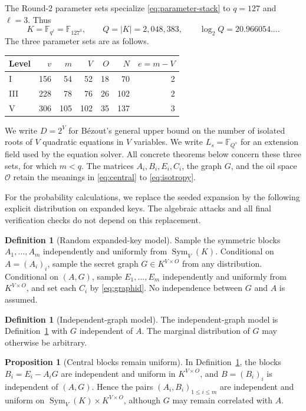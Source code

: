 \documentclass[11pt,a4paper]{article}
\theoremstyle{definition}
\newtheorem{proposition}[theorem]{Proposition}
\newtheorem{definition}[theorem]{Definition}
\theoremstyle{remark}
\newcommand{\F}{\mathbb F}
\newcommand{\cO}{\mathcal O}
\newcommand{\Sym}{\operatorname{Sym}}
\begin{document}
The Round-2 parameter sets specialize \eqref{eq:parameter-stack} to $q=127$
and $\ell=3$.  Thus
\[
 K=\F_{q^\ell}=\F_{127^3},\qquad
 Q=|K|=2{,}048{,}383,
 \qquad \log_2 Q=20.966054\ldots.
\]
The three parameter sets are as follows.
\begin{center}
\begin{tabular}{@{}lrrrrrr@{}}
\toprule
Level & $v$ & $m$ & $V$ & $O$ & $N$ & $e=m-V$\\
\midrule
I&156&54&52&18&70&2\\
III&228&78&76&26&102&2\\
V&306&105&102&35&137&3\\
\bottomrule
\end{tabular}
\end{center}
We write $D=2^V$ for B\'ezout's general upper bound on the number of isolated
roots of $V$ quadratic equations in $V$ variables.  We write $L_s=\F_{Q^s}$ for an
extension field used by the equation solver.  All concrete theorems below
concern these three sets, for which $m<q$.  The matrices
$A_i,B_i,E_i,C_i$, the graph $G$, and the oil space $\cO$ retain the meanings
in \eqref{eq:central} to \eqref{eq:isotropy}.

For the probability calculations, we replace the seeded expansion by the
following explicit distribution on expanded keys.  The algebraic attacks and
all final verification checks do not depend on this replacement.

\begin{definition}[Random expanded-key model]\label{def:ideal}
Sample the symmetric blocks $A_1,\ldots,A_m$ independently and uniformly from
$\Sym_V(K)$.  Conditional on $A=(A_i)_i$, sample the secret graph
$G\in K^{V\times O}$ from any distribution.  Conditional on $(A,G)$, sample
$E_1,\ldots,E_m$ independently and uniformly from $K^{V\times O}$, and set
each $C_i$ by \eqref{eq:graphid}.  No independence between $G$ and $A$ is
assumed.
\end{definition}

\begin{definition}[Independent-graph model]\label{def:direct-ideal}
The independent-graph model is Definition~\ref{def:ideal} with $G$ independent of $A$.
The marginal distribution of $G$ may otherwise be arbitrary.
\end{definition}

\begin{proposition}[Central blocks remain uniform]\label{prop:ideal-factorization}
In Definition~\ref{def:ideal}, the blocks $B_i=E_i-A_iG$ are independent and uniform in
$K^{V\times O}$, and $B=(B_i)_i$ is independent of $(A,G)$.  Hence the pairs
$(A_i,B_i)_{1\le i\le m}$ are independent and uniform on
$\Sym_V(K)\times K^{V\times O}$, although $G$ may remain correlated with $A$.
\end{proposition}
\end{document}
